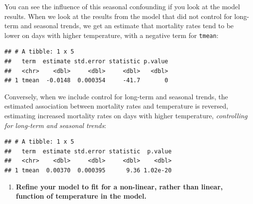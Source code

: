\documentclass[
]{book}
\newenvironment{Shaded}{\begin{snugshade}}{\end{snugshade}}
\newcommand{\KeywordTok}[1]{\textcolor[rgb]{0.13,0.29,0.53}{\textbf{#1}}}
\newcommand{\NormalTok}[1]{#1}
\newcommand{\OperatorTok}[1]{\textcolor[rgb]{0.81,0.36,0.00}{\textbf{#1}}}
\newcommand{\StringTok}[1]{\textcolor[rgb]{0.31,0.60,0.02}{#1}}
\providecommand{\tightlist}{%
  \setlength{\itemsep}{0pt}\setlength{\parskip}{0pt}}
\begin{document}
You can see the influence of this seasonal confounding if you look at the model
results. When we look at the results from the model that did not control for
long-term and seasonal trends, we get an estimate that mortality rates tend to
be lower on days with higher temperature, with a negative term for \texttt{tmean}:

\begin{Shaded}
\end{Shaded}

\begin{verbatim}
## # A tibble: 1 x 5
##   term  estimate std.error statistic p.value
##   <chr>    <dbl>     <dbl>     <dbl>   <dbl>
## 1 tmean  -0.0148  0.000354     -41.7       0
\end{verbatim}

Conversely, when we include control for long-term and seasonal trends, the
estimated association between mortality rates and temperature is reversed,
estimating increased mortality rates on days with higher temperature, \emph{controlling
for long-term and seasonal trends}:

\begin{Shaded}
\end{Shaded}

\begin{verbatim}
## # A tibble: 1 x 5
##   term  estimate std.error statistic  p.value
##   <chr>    <dbl>     <dbl>     <dbl>    <dbl>
## 1 tmean  0.00370  0.000395      9.36 1.02e-20
\end{verbatim}

\begin{enumerate}
\def\labelenumi{\arabic{enumi}.}
\setcounter{enumi}{2}
\tightlist
\item
  \textbf{Refine your model to fit for a non-linear, rather than linear, function
  of temperature in the model.}
\end{enumerate}
\end{document}
